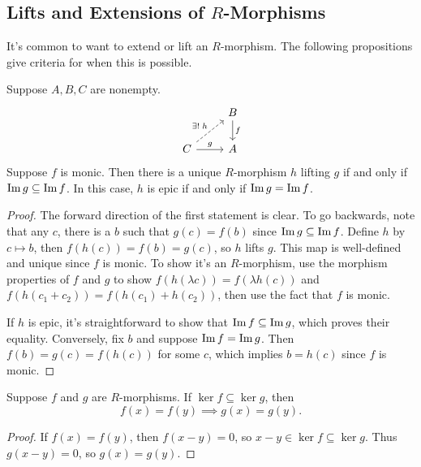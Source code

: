 \documentclass[twoside,10pt]{report}
\begin{document}
\subsection{Lifts and Extensions of \texorpdfstring{$R$}{R}-Morphisms}

It's common to want to extend or lift an $R$-morphism. The following propositions give criteria for when this is possible.

\begin{prop}
	\label{prop:unique-lift}
Suppose $A, B, C$ are nonempty.
\[
\begin{tikzcd}
	& B \dar{f} \\
	C \arrow[ur, dashed, "\exists! \;h"] \rar{g} & A
\end{tikzcd}
\] 
Suppose $f$ is monic. Then there is a unique $R$-morphism $h$ lifting $g$ if and only if $\operatorname{Im} g \subseteq \operatorname{Im} f$. In this case, $h$ is epic if and only if $\operatorname{Im} g = \operatorname{Im} f$.
\end{prop}
\begin{proof}
	The forward direction of the first statement is clear. To go backwards, note that any $c$, there is a $b$ such that $g(c) = f(b)$ since $\operatorname{Im} g \subseteq \operatorname{Im} f$. Define $h$ by $c \mapsto b$, then $f(h(c)) = f(b)=g(c)$, so $h$ lifts $g$. This map is well-defined and unique since $f$ is monic. To show it's an $R$-morphism, use the morphism properties of $f$ and $g$ to show $f(h(\lambda c)) = f(\lambda h(c))$ and $f(h(c_1+c_2)) = f(h(c_1)+h(c_2))$, then use the fact that $f$ is monic.

	If $h$ is epic, it's straightforward to show that $\operatorname{Im} f \subseteq \operatorname{Im} g$, which proves their equality. Conversely, fix $b$ and suppose $\operatorname{Im} f = \operatorname{Im} g$. Then $f(b) = g(c) = f(h(c))$ for some $c$, which implies $b = h(c)$ since $f$ is monic.
\end{proof}

\begin{lem}
Suppose $f$ and $g$ are $R$-morphisms. If $\ker f \subseteq \ker g$, then
\[
	f(x) = f(y) \implies g(x) = g(y).
\] 
\end{lem}
\begin{proof}
	If $f(x) = f(y)$, then $f(x-y)=0$, so $x-y \in \ker f \subseteq \ker g$. Thus $g(x-y) = 0$, so $g(x)=g(y)$.
\end{proof}
\end{document}
